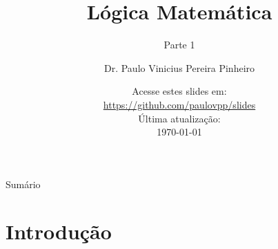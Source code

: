 \documentclass[10pt]{beamer}
\title{Lógica Matemática}
\subtitle{Parte 1}
\author[Paulo Pinheiro]
{Dr. Paulo Vinicius Pereira Pinheiro\inst{1}}
\institute[UNIFAP]
{
    \inst{1}
    Centro Universitário Paraíso do Ceará\\
    UNIFAP
}
\date{\small{Acesse estes slides em:\\ \url{https://github.com/paulovpp/slides}}\newline \\Última atualização:\\ \today}
\begin{document}
\begin{frame}
    \titlepage 
\end{frame}

\logo{}

\begin{frame}{Sumário}
    \tableofcontents
\end{frame}
\section{Introdução}
%
\end{document}
